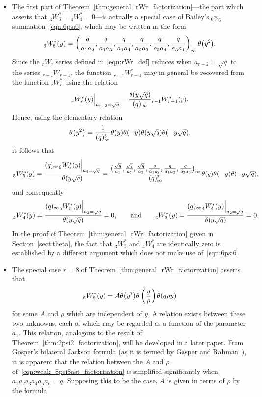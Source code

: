 \documentclass[pdftex]{sigma}
\numberwithin{equation}{section}
\begin{document}
\begin{Remark}\quad
\begin{itemize}\itemsep=0pt
\item[(i)] The first part of Theorem~\ref{thm:general_rWr_factorization}---the part which asserts that $_3^{}W_3^\ast= {}_4^{}W_4^\ast=0$---is actually a special case of Bailey's $_6\psi_6$ summation~\eqref{eqn:6psi6}, which may be written in the form
\[%
_6^{}W_6^\ast(y) = \left({q \over a_1a_2}, {q \over a_1a_3}, {q \over a_1a_4}, {q \over a_2a_3}, {q \over a_2a_4}, {q \over a_3a_4}\right)_{ \infty} \theta\bigl(y^2\bigr).
\]
Since the $_rW_r$ series defined in~\eqref{eqn:rWr_def} reduces when $a_{r-2}=\sqrt{q}$ to the series $_{r-1}W_{r-1}$, the function $_{r-1}^{}W_{r-1}^\ast$ may in general be recovered from the function $_r^{}W_r^\ast$ using the relation
\[ _r^{}W_r^\ast(y) \Big|_{a_{r-2}=\sqrt{q}} = {\theta(y\sqrt{q}) \over (q)_\infty} {}_{r-1}^{}W_{r-1}^\ast(y). \]
Hence, using the elementary relation
\begin{equation} \label{eqn:theta_squared-argument_identity}
\theta\bigl(y^2\bigr) = {1 \over (q)_\infty^3} \theta(y) \theta(-y) \theta(y\sqrt{q}) \theta(-y\sqrt{q}),
\end{equation}
it follows that
\[ {}_5^{}W_5^\ast(y) = {(q)_\infty {}_6^{}W_6^\ast(y) \Big|_{a_4=\sqrt{q}} \over \theta(y\sqrt{q})} = {\bigl({\sqrt{q} \over a_1}, {\sqrt{q} \over a_2}, {\sqrt{q} \over a_3}, {q \over a_1a_2}, {q \over a_1a_3}, {q \over a_2a_3}\bigr)_\infty \over (q)_\infty^2} \theta(y) \theta(-y) \theta(-y\sqrt{q}), \]
and consequently
\[ _4^{}W_4^\ast(y) = {(q)_\infty {}_5^{}W_5^\ast(y) \Big|_{a_3=\sqrt{q}} \over \theta(y\sqrt{q})} = 0, \qquad \text{and} \qquad _3^{}W_3^\ast(y) = {(q)_\infty {}_4^{}W_4^\ast(y) \Big|_{a_2=\sqrt{q}} \over \theta(y\sqrt{q})} = 0. \]
In the proof of Theorem~\ref{thm:general_rWr_factorization} given in Section~\ref{sect:theta}, the fact that $_3^{}W_3^\ast$ and $_4^{}W_4^\ast$ are identically zero is established by a different argument which does not make use of~\eqref{eqn:6psi6}.
\item[(ii)] The special case $r=8$ of Theorem~\ref{thm:general_rWr_factorization} asserts that
\begin{equation} \label{eqn:weak_8psi8ast_factorization}
_8^{}W_8^\ast(y) = A \theta\bigl(y^2\bigr) \theta\left( {y \over \rho} \right) \theta( q\rho y)
\end{equation}
for some $A$ and $\rho$ which are independent of $y$. A relation exists between these two unknowns, each of which may be regarded as a function of the parameter $a_1$. This relation, analogous to the result of Theorem~\ref{thm:2psi2_factorization}, will be developed in a later paper. From Gosper's bilateral Jackson formula (as it is termed by Gasper and Rahman~\cite[Exercise~5.12]{Gasper2004}), it is apparent that the relation between the $A$ and $\rho$ of~\eqref{eqn:weak_8psi8ast_factorization} is simplified significantly when $a_1a_2a_3a_4a_5a_6=q$. Supposing this to be the case, $A$ is given in terms of $\rho$ by the formula

\end{itemize}
\end{Remark}
\end{document}
